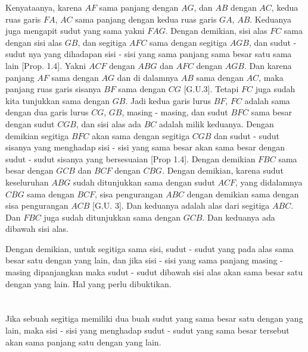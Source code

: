 \documentclass[a4paper]{book}
\begin{document}
Kenyataanya, karena $AF$ sama panjang dengan $AG$, dan $AB$ dengan $AC$, kedua
ruas garis $FA$, $AC$ sama panjang dengan kedua ruas garis $GA$, $AB$. Keduanya
juga mengapit sudut yang sama yakni $FAG$. Dengan demikian, sisi alas $FC$ sama 
dengan sisi alas $GB$, dan segitiga $AFC$ sama dengan segitiga $AGB$, dan sudut
- sudut nya yang dihadapan sisi - sisi yang sama panjang sama besar satu sama
lain [Prop. 1.4]. Yakni $ACF$ dengan $ABG$ dan $AFC$ dengan $AGB$. Dan karena
panjang $AF$ sama dengan $AG$ dan di dalamnya $AB$ sama dengan $AC$, maka panjang
ruas garis sisanya $BF$ sama dengan $CG$ [G.U.3]. Tetapi $FC$ juga sudah kita
tunjukkan sama dengan $GB$. Jadi kedua garis lurus $BF$, $FC$ adalah sama dengan
dua garis lurus $CG$, $GB$, masing - masing, dan sudut $BFC$ sama besar dengan 
sudut $CGB$, dan sisi alas ada $BC$ adalah milik keduanya. Dengan demikian 
segitiga $BFC$ akan sama dengan segitiga $CGB$ dan sudut - sudut sisanya yang
menghadap sisi - sisi yang sama besar akan sama besar dengan 
sudut - sudut sisanya yang bersesuaian [Prop 1.4]. Dengan demikian $FBC$ sama
besar dengan $GCB$ dan $BCF$ dengan $CBG$. Dengan demikian, karena sudut 
keseluruhan $ABG$ sudah ditunjukkan sama dengan sudut $ACF$, yang didalamnya 
$CBG$ sama dengan $BCF$, sisa pengurangan $ABC$ dengan demikian sama dengan 
sisa pengurangan $ACB$ [G.U. 3]. Dan keduanya adalah alas dari segitiga $ABC$.
Dan $FBC$ juga sudah ditunjukkan sama dengan $GCB$. Dan keduanya ada dibawah
sisi alas.

Dengan demikian, untuk segitiga sama sisi, sudut - sudut yang pada alas sama
besar satu dengan yang lain, dan jika sisi - sisi yang sama panjang 
masing - masing dipanjangkan maka sudut - sudut dibawah sisi alas akan sama 
besar satu dengan yang lain. Hal yang perlu dibuktikan.

\section*{\centering \thesection} 
Jika sebuah segitiga memiliki dua buah sudut yang sama besar satu dengan yang 
lain, maka sisi - sisi yang menghadap sudut - sudut yang sama besar tersebut
akan sama panjang satu dengan yang lain.
\begin{center}
\end{center} 
\end{document}
